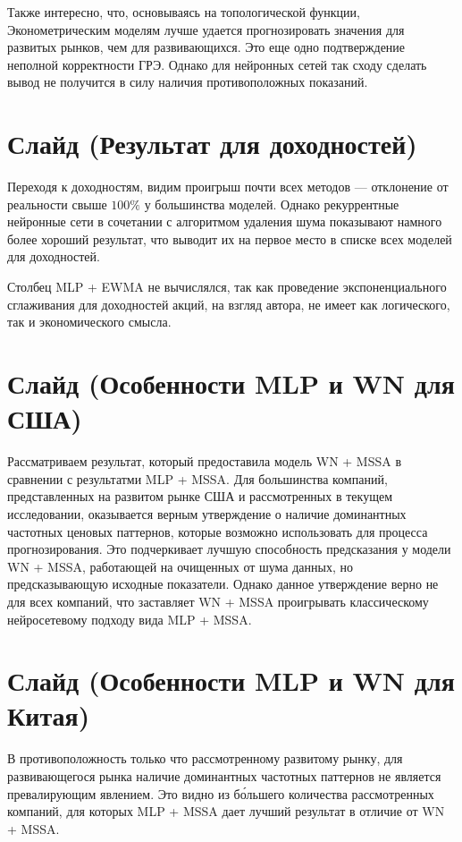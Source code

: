 \documentclass[a4paper, 12pt]{article}
\begin{document}
		Также интересно, что, основываясь на топологической функции, Эконометрическим моделям лучше удается прогнозировать значения для развитых рынков, чем для развивающихся. Это еще одно подтверждение неполной корректности ГРЭ. Однако для нейронных сетей так сходу сделать вывод не получится в силу наличия противоположных показаний.
		
	\section{Слайд (Результат для доходностей)}
		Переходя к доходностям, видим проигрыш почти всех методов --- отклонение от реальности свыше $100\%$ у большинства моделей. Однако рекуррентные нейронные сети в сочетании с алгоритмом удаления шума показывают намного более хороший результат, что выводит их на первое место в списке всех моделей для доходностей.
		
		Столбец MLP + EWMA не вычислялся, так как проведение экспоненциального сглаживания для доходностей акций, на взгляд автора, не имеет как логического, так и экономического смысла.
		
	\section{Слайд (Особенности MLP и WN для США)}
		Рассматриваем результат, который предоставила модель WN + MSSA в сравнении с результатми MLP + MSSA. Для большинства компаний, представленных на развитом рынке США и рассмотренных в текущем исследовании, оказывается верным утверждение о наличие доминантных частотных ценовых паттернов, которые возможно использовать для процесса прогнозирования. Это подчеркивает лучшую способность предсказания у модели WN + MSSA, работающей на очищенных от шума данных, но предсказывающую исходные показатели. Однако данное утверждение верно не для всех компаний, что заставляет WN + MSSA проигрывать классическому нейросетевому подходу вида MLP + MSSA.
	
	\section{Слайд (Особенности MLP и WN для Китая)}
		В противоположность только что рассмотренному развитому рынку, для развивающегося рынка наличие доминантных частотных паттернов не является превалирующим явлением. Это видно из б\'{о}льшего количества рассмотренных компаний, для которых MLP + MSSA дает лучший результат в отличие от WN + MSSA. 
		
\end{document}
